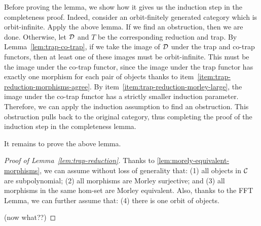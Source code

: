 Before proving the lemma, we show how it gives us the induction step in the completeness proof. Indeed, consider an orbit-finitely generated category which is orbit-infinite. Apply the above lemma. If we find an obstruction, then we are done. Otherwise, let ${\mathcal D}$ and $T$ be the corresponding reduction and trap. By Lemma~\ref{lem:trap-co-trap}, if we take the image of ${\mathcal D}$ under the trap and co-trap functors, then at least one of these images must be orbit-infinite. This must be the image under the co-trap functor, since the image under the trap functor has exactly one morphism for each pair of objects thanks to item~\ref{item:trap-reduction-morphisms-agree}. By item~\ref{item:trap-reduction-morley-large}, the image under the co-trap functor has a strictly smaller induction parameter. Therefore, we can apply the induction assumption to find an obstruction. This obstruction pulls back to the original category, thus completing the proof of the induction step in the completeness lemma. 

It remains to prove the above lemma. 

\begin{proof}[Proof of Lemma~\ref{lem:trap-reduction}]
    Thanks to \cref{lem:morely-equivalent-morphisms}, we can assume without loss of generality that: (1) all objects in ${\mathcal C}$ are subpolynomial; (2) all morphisms are Morley surjective; and (3) all morphisms in the same hom-set are Morley equivalent. Also, thanks to the FFT Lemma, we can further assume that: (4) there is one orbit of objects.

    (now what??)
\end{proof}


